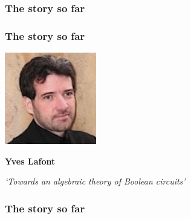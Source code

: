 \begin{frame}
    \frametitle{The story so far}

    \pause
    \centering


\end{frame}

\begin{frame}
    \frametitle{The story so far}

    \centering
    \includegraphics[width=0.3\textwidth]{imgs/lafont}

    \LARGE
    \textbf{Yves Lafont}

    \normalsize
    \emph{`Towards an algebraic theory of Boolean circuits'}

\end{frame}

\begin{frame}
    \frametitle{The story so far}

    \centering


\end{frame}

